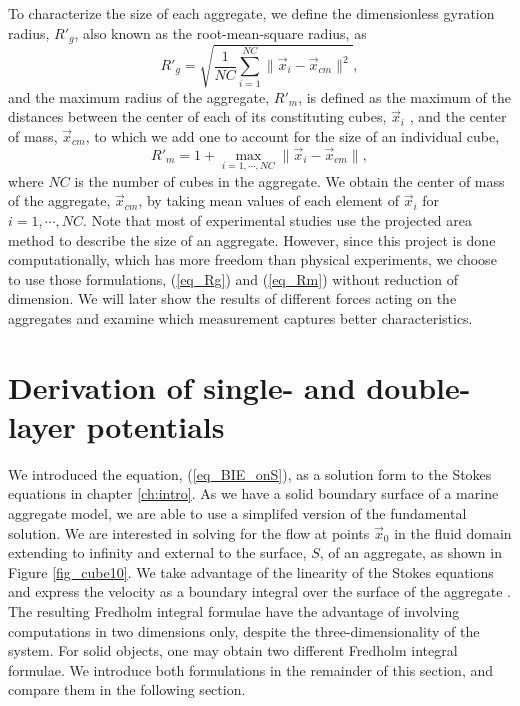 \par 
To characterize the size of each aggregate, we define the dimensionless gyration radius, $R'_g$, also known as the root-mean-square radius, as
\begin{equation}
{R'}_g  = \sqrt{\frac{1}{NC} \sum_{i=1}^{NC} \| \vec{x}_i - \vec{x}_{cm} \|^2},
\label{eq_Rg}
\end{equation}
and the maximum radius of the aggregate, $R'_m$, is defined as the
maximum of the distances between the center of each of its constituting cubes, $\vec{x}_i$ , and the center of
mass, $\vec{x}_{cm}$, to which we add one to account for the size of an individual cube,
\begin{equation}
{R'}_m = 1+ \max_{i = 1, \cdots, NC} \| \vec{x}_i - \vec{x}_{cm} \|,
\label{eq_Rm}
\end{equation}
where $NC$ is the number of cubes in the aggregate.
We obtain the center of mass of the aggregate, $\vec{x}_{cm}$, by taking mean values of each element of $\vec{x}_i$ for $i = 1, \cdots, NC$.
Note that most of experimental studies use the projected area method to describe the size of an aggregate. However, since this project is done computationally, which has more freedom than physical experiments, we choose to use those formulations, (\ref{eq_Rg}) and (\ref{eq_Rm}) without reduction of dimension.
We will later show the results of different forces acting on the aggregates and examine which measurement captures better characteristics.

%
\section{Derivation of single- and double-layer potentials}
We introduced the equation, (\ref{eq_BIE_onS}), as a solution form to the Stokes equations in chapter \ref{ch:intro}. As we have a solid boundary surface of a marine aggregate model, we are able to use a simplifed version of the fundamental solution. We are interested in solving for the flow at points $\vec{x}_0$ in the fluid domain extending to infinity and external to the surface, $S$, of an aggregate, as shown in Figure \ref{fig_cube10}.
We  take advantage of the linearity of the Stokes equations and  express the velocity as a boundary integral  over the surface of the aggregate \cite{pozrikidis_boundary_1992, stakgold_boundary_2000}. 
The resulting Fredholm integral formulae have the advantage of involving computations in two dimensions only, despite the three-dimensionality of the system.
For solid objects, one may obtain two different  Fredholm integral formulae. We introduce both formulations in the remainder of this section, and compare them in the following section. 
